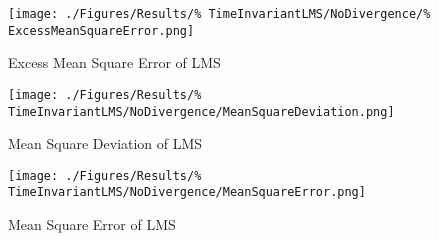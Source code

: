 \begin{figure}[ht]
	\centering
	\begin{minipage}{0.49\textwidth}
		\centering
		\texttt{[image: ./Figures/Results/\%
		TimeInvariantLMS/NoDivergence/\%
		ExcessMeanSquareError.png]}
		\captionsetup{width=0.75\linewidth}
		\caption{Excess Mean Square Error of LMS}
		\label{fig:LMS-EMSE}
	\end{minipage}
	\begin{minipage}{0.49\textwidth}
		\centering
		\texttt{[image: ./Figures/Results/\%
		TimeInvariantLMS/NoDivergence/MeanSquareDeviation.png]}
		\captionsetup{width=0.75\linewidth}
		\caption{Mean Square Deviation of LMS}
		\label{fig:LMS-MSD}
	\end{minipage}
\end{figure}
\begin{figure}[ht]
	\centering
	\texttt{[image: ./Figures/Results/\%
	TimeInvariantLMS/NoDivergence/MeanSquareError.png]}
	\captionsetup{width=0.75\linewidth}
	\caption{Mean Square Error of LMS}
	\label{fig:LMS-MSE}
\end{figure}

